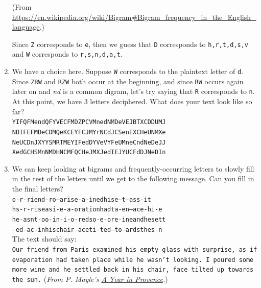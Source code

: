 \documentclass[12pt]{amsart}
\theoremstyle{plain}
\theoremstyle{definition}
\theoremstyle{remark}
\begin{document}
\begin{enumerate}[1.]
\begin{center}
	\tiny{(From \url{https://en.wikipedia.org/wiki/Bigram#Bigram_frequency_in_the_English_language}.)}
	\end{center}
	Since \texttt{Z} corresponds to \texttt{e}, then we guess that \texttt{D} corresponds to \texttt{h,r,t,d,s,v} and \texttt{W} corresponds to \texttt{r,s,n,d,a,t}.\\
	\item We have a choice here.  Suppose \texttt{W} corresponds to the plaintext letter of \texttt{d}.  Since \texttt{ZRW} and \texttt{RZW} both occur at the beginning, and since \texttt{RW} occurs again later on and \textit{nd} is a common digram, let's try saying that \texttt{R} corresponds to \texttt{n}.  At this point, we have 3 letters deciphered.  What does your text look like so far?\\

{\Large\texttt{YIFQFMendQFYVECFMDZPCVMnedNMDeVEJBTXCDDUMJ}}\\

{\Large\texttt{NDIFEFMDeCDMQeKCEYFCJMYrNCdJCSenEXCHeUNMXe}}\\

{\Large\texttt{NeUCDnJXYYSMRTMEYIFedDYVeVYFeUMneCndNeDeJJ}}\\

{\Large\texttt{XedGCHSMnNMDHNCMFQCHeJMXJedIEJYUCFdDJNeDIn}}\\

\item We can keep looking at bigrams and frequently-occurring letters to slowly fill in the rest of the letters until we get to the following message.  Can you fill in the final letters?\\


{\Large\texttt{o-r-riend-ro--arise-a-inedhise--t---ass-it}}\\

{\Large\texttt{hs-r-riseasi-e-a-orationhadta-en--ace-hi-e}}\\

{\Large\texttt{he-asnt-oo-in-i-o-redso-e-ore-ineandhesett}}\\

{\Large\texttt{-ed-ac-inhischair-aceti-ted--to-ardsthes-n}}\\


The text should say:\\
\texttt{Our friend from Paris examined his empty glass with surprise, as if evaporation had taken place while he wasn't looking.  I poured some more wine and he settled back in his chair, face tilted up towards the sun.} (\textit{From P. Mayle's \underline{A Year in Provence}.})
\end{enumerate}
\end{document}
